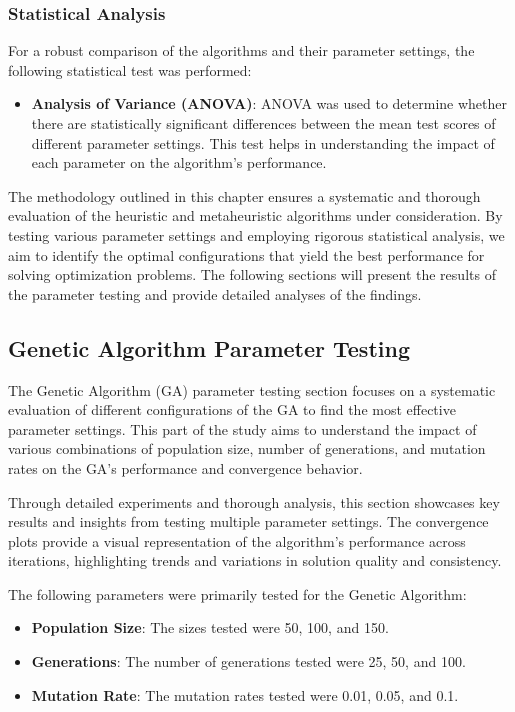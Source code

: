 \documentclass[
]{article}
\begin{document}
    \subsubsection{Statistical Analysis}

    For a robust comparison of the algorithms and their parameter settings, the following statistical test was performed:

    \begin{itemize}
        \item \textbf{Analysis of Variance (ANOVA)}: ANOVA was used to determine whether there are statistically significant differences between the mean test scores of different parameter settings. This test helps in understanding the impact of each parameter on the algorithm's performance.
    \end{itemize}


    The methodology outlined in this chapter ensures a systematic and thorough evaluation of the heuristic and metaheuristic algorithms under consideration. By testing various parameter settings and employing rigorous statistical analysis, we aim to identify the optimal configurations that yield the best performance for solving optimization problems. The following sections will present the results of the parameter testing and provide detailed analyses of the findings.


    \newpage

    \subsection{Genetic Algorithm Parameter Testing}
    The Genetic Algorithm (GA) parameter testing section focuses on a systematic evaluation of different configurations of the GA to find the most effective parameter settings. This part of the study aims to understand the impact of various combinations of population size, number of generations, and mutation rates on the GA's performance and convergence behavior.

    Through detailed experiments and thorough analysis, this section showcases key results and insights from testing multiple parameter settings. The convergence plots provide a visual representation of the algorithm's performance across iterations, highlighting trends and variations in solution quality and consistency.

    The following parameters were primarily tested for the Genetic Algorithm:

    \begin{itemize}
        \item \textbf{Population Size}: The sizes tested were 50, 100, and 150.
        \item \textbf{Generations}: The number of generations tested were 25, 50, and 100.
        \item \textbf{Mutation Rate}: The mutation rates tested were 0.01, 0.05, and 0.1.
    \end{itemize}
\end{document}
